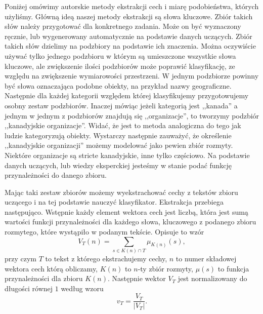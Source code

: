 \documentclass[a4paper]{classrep}
\begin{document}
Poniżej omówimy autorskie metody ekstrakcji cech i miarę podobieństwa, których użyliśmy. 
Główną ideą naszej metody ekstrakcji są słowa kluczowe. Zbiór takich słów należy przygotować dla konkretnego zadania. Może on być wyznaczony ręcznie,
lub wygenerowany automatycznie na podstawie danych uczących. Zbiór takich słów dzielimy na podzbiory na podstawie ich znaczenia. Można oczywiście używać tylko jednego podzbioru
w którym są umieszczone wszystkie słowa kluczowe, ale zwiększenie ilości podzbiorów może poprawić klasyfikację, ze względu na zwiększenie wymiarowości przestrzeni. 
W jednym podzbiorze powinny być słowa oznaczająca podobne obiekty, na przykład nazwy geograficzne. Następnie dla każdej kategorii względem której klasyfikujemy przygotowujemy
osobny zestaw podzbiorów. Inaczej mówiąc jeżeli kategorią jest ,,kanada'' a jednym w jednym z podzbiorów znajdują się ,,organizacje'', to tworzymy podzbiór ,,kanadyjskie organizacje''.
Widać, że jest to metoda analogiczna do tego jak ludzie kategoryzują obiekty. Wystarczy następnie zauważyć, że określenie ,,kanadyjskie organizacji'' możemy modelować
jako pewien zbiór rozmyty. Niektóre organizacje są stricte kanadyjskie, inne tylko częściowo. Na podstawie danych uczących, lub wiedzy eksperckiej jesteśmy w stanie podać
funkcję przynależności do danego zbioru.

Mając taki zestaw zbiorów możemy wyekstrachować cechy z tekstów zbioru uczącego i na tej podstawie nauczyć klasyfikator. Ekstrakcja przebiega następująco. Wstępnie każdy element wektora
cech jest liczbą, która jest sumą wartości funkcji przynależności dla każdego słowa, kluczowego z podanego zbioru rozmytego, które wystąpiło w podanym tekście.
Opisuje to wzór
\[V_T(n)=\sum_{s\in K(n) \cap T} \mu_{K(n)}(s),\]
przy czym \(T\) to tekst z którego ekstrachujemy cechy, \(n\) to numer składowej wektora cech którą obliczamy, \(K(n)\) to \(n\)-ty zbiór rozmyty, \(\mu(s)\) to funkcja przynależności
dla zbioru \(K(n)\).
Następnie wektor \(V_T\) jest normalizowany do długości równej \(1\) według wzoru
\[v_T = \frac{V_T}{|V_T|}.\]
\end{document}

